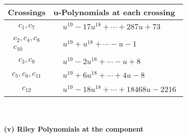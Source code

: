 \documentclass[1p]{elsarticle_modified}
\theoremstyle{definition}
\begin{document}
\begin{tabular}{m{50pt}|m{274pt}}
Crossings & \hspace{64pt}u-Polynomials at each crossing \\
\hline $$\begin{aligned}c_{1},c_{7}\end{aligned}$$&$\begin{aligned}
&u^{19}-17 u^{18}+\cdots+287 u+73
\end{aligned}$\\
\hline $$\begin{aligned}c_{2},c_{4},c_{8}\\c_{10}\end{aligned}$$&$\begin{aligned}
&u^{19}+u^{18}+\cdots- u-1
\end{aligned}$\\
\hline $$\begin{aligned}c_{3},c_{9}\end{aligned}$$&$\begin{aligned}
&u^{19}-2 u^{18}+\cdots- u+8
\end{aligned}$\\
\hline $$\begin{aligned}c_{5},c_{6},c_{11}\end{aligned}$$&$\begin{aligned}
&u^{19}+6 u^{18}+\cdots+4 u-8
\end{aligned}$\\
\hline $$\begin{aligned}c_{12}\end{aligned}$$&$\begin{aligned}
&u^{19}-18 u^{18}+\cdots+18468 u-2216
\end{aligned}$\\
\hline
\end{tabular}\\~\\
\newpage\renewcommand{\arraystretch}{1}
\flushleft \textbf{(v) Riley Polynomials at the component}\newline \\
\end{document}
